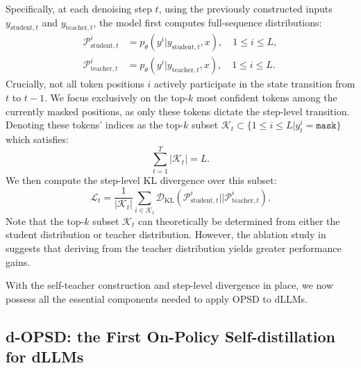 \documentclass{llmxive}
\providecommand{\mask}{{\texttt{mask}}}
\begin{document}
Specifically, at each denoising step $t$, using the previously constructed inputs $y_{\text{student},t}$ and $y_{\text{teacher},t}$, the model first computes full-sequence distributions:
\begin{equation}
\begin{aligned}
    \mathcal{P}_{\text{student}, t}^i &= p_\theta(y^i|y_{\text{student},t}, x), \quad 1 \leq i \leq L, \\
    \mathcal{P}_{\text{teacher}, t}^i &= p_\theta(y^i|y_{\text{teacher},t}, x), \quad 1 \leq i \leq L.
\end{aligned}
\label{eq10}
\end{equation}
Crucially, not all token positions $i$ actively participate in the state transition from $t$ to $t-1$. We focus exclusively on the top-$k$ most confident tokens among the currently masked positions, as only these tokens dictate the step-level transition. Denoting these tokens' indices as the top-$k$ subset $\mathcal{K}_t \subset \{ 1 \leq i \leq L | y_t^i = \mask  \}$ which satisfies:
\begin{equation}
    \sum_{t=1}^T |\mathcal{K}_t|= L.
\end{equation}
We then compute the step-level KL divergence over this subset:
\begin{equation}
    \mathcal{L}_t = \frac{1}{|\mathcal{K}_t|}  \sum_{i \in \mathcal{K}_t}  \mathcal{D}_\text{KL} \left(  \mathcal{P}_{\text{student}, t}^i || \mathcal{P}_{\text{teacher}, t}^i \right).
\end{equation}
Note that the top-$k$ subset $\mathcal{K}_t$ can theoretically be determined from either the student distribution or teacher distribution. However, the ablation study in  suggests that deriving from the teacher distribution yields greater performance gains.

With the self-teacher construction and step-level divergence in place, we now possess all the essential components needed to apply OPSD to dLLMs.


\subsection{d-OPSD: the First On-Policy Self-distillation for dLLMs} \label{sec3.3}
\end{document}
